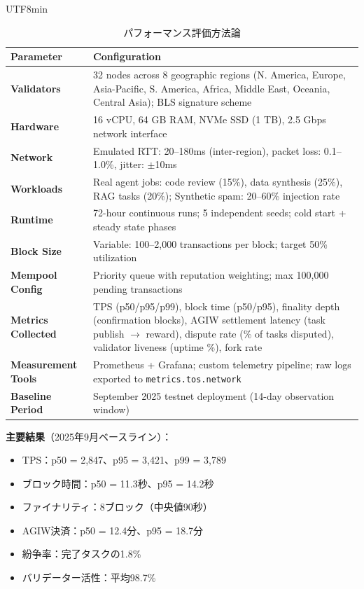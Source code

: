 \documentclass[11pt]{article}
\begin{document}
\begin{CJK}{UTF8}{min}
\begin{table}[H]
\centering
\caption{パフォーマンス評価方法論}
\label{tab:evaluation-methodology}
\begin{tabular}{@{}p{}p{}@{}}
\toprule
\textbf{Parameter} & \textbf{Configuration} \\ \midrule
\textbf{Validators} & 32 nodes across 8 geographic regions (N. America, Europe, Asia-Pacific, S. America, Africa, Middle East, Oceania, Central Asia); BLS signature scheme \\
\textbf{Hardware} & 16 vCPU, 64 GB RAM, NVMe SSD (1 TB), 2.5 Gbps network interface \\
\textbf{Network} & Emulated RTT: 20--180ms (inter-region), packet loss: 0.1--1.0\%, jitter: $\pm$10ms \\
\textbf{Workloads} & Real agent jobs: code review (15\%), data synthesis (25\%), RAG tasks (20\%); Synthetic spam: 20--60\% injection rate \\
\textbf{Runtime} & 72-hour continuous runs; 5 independent seeds; cold start + steady state phases \\
\textbf{Block Size} & Variable: 100--2,000 transactions per block; target 50\% utilization \\
\textbf{Mempool Config} & Priority queue with reputation weighting; max 100,000 pending transactions \\
\textbf{Metrics Collected} & TPS (p50/p95/p99), block time (p50/p95), finality depth (confirmation blocks), AGIW settlement latency (task publish $\rightarrow$ reward), dispute rate (\% of tasks disputed), validator liveness (uptime \%), fork rate \\
\textbf{Measurement Tools} & Prometheus + Grafana; custom telemetry pipeline; raw logs exported to \texttt{metrics.tos.network} \\
\textbf{Baseline Period} & September 2025 testnet deployment (14-day observation window) \\
\bottomrule
\end{tabular}
\end{table}

\textbf{主要結果}（2025年9月ベースライン）：
\begin{itemize}[noitemsep]
  \item TPS：p50 = 2,847、p95 = 3,421、p99 = 3,789
  \item ブロック時間：p50 = 11.3秒、p95 = 14.2秒
  \item ファイナリティ：8ブロック（中央値90秒）
  \item AGIW決済：p50 = 12.4分、p95 = 18.7分
  \item 紛争率：完了タスクの1.8\%
  \item バリデーター活性：平均98.7\%
\end{itemize}


\end{CJK}
\end{document}
